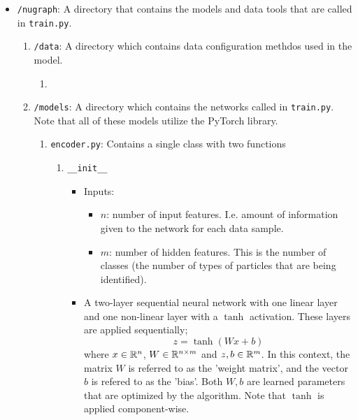 \begin{itemize}
    \item \texttt{/nugraph}: A directory that contains the models and data tools that are called in \texttt{train.py}.
        \begin{enumerate}
            \item \texttt{/data}: A directory which contains data configuration methdos used in the model.
                \begin{enumerate}
                    \item 
                \end{enumerate}
            \item \texttt{/models}: A directory which contains the networks called in \texttt{train.py}. Note that all of these models utilize the PyTorch library.
                \begin{enumerate}
                    \item \texttt{encoder.py}: Contains a single class with two functions
                        \begin{enumerate}
                            \item \texttt{\_\_init\_\_}
                            \begin{itemize}
                                \item Inputs:
                                    \begin{itemize}
                                        \item $n$: number of input features. I.e. amount of information given to the network for each data sample.

                                        \item $m$: number of hidden features. This is the number of classes (the number of types of particles that are being identified).
                                    \end{itemize}

                                \item A  two-layer sequential neural network with one linear layer and one non-linear layer with a $\tanh$ activation. These layers are applied sequentially;
                                    \begin{equation}
                                        z = \tanh\left(Wx + b\right)
                                    \end{equation}
                                where $x\in \mathbb{R}^n$, $W\in \mathbb{R}^{n\times m}$ and $z, b\in \mathbb{R}^m$. In this context, the matrix $W$ is referred to as the 'weight matrix', and the vector $b$ is refered to as the 'bias'. Both $W, b$ are learned parameters that are optimized by the algorithm. Note that $\tanh$ is applied component-wise.



\end{itemize}
\end{enumerate}
\end{enumerate}
\end{enumerate}
\end{itemize}
